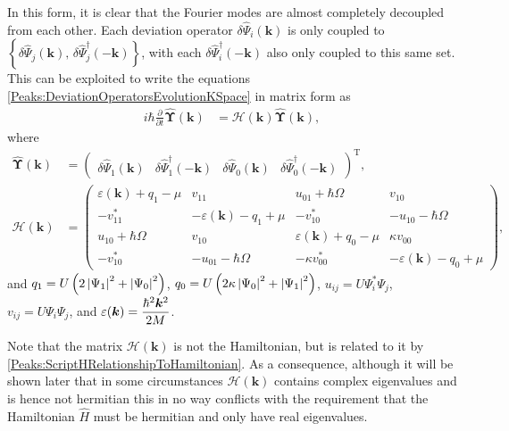 In this form, it is clear that the Fourier modes are almost completely decoupled from each other. Each deviation operator $\delta\hat{\Psi}_i(\bm{k})$ is only coupled to $\left\{\delta\hat{\Psi}_j(\bm{k}),\, \delta\hat{\Psi}_j^\dagger(-\bm{k})\right\}$, with each $\delta\hat{\Psi}_i^\dagger(-\bm{k})$ also only coupled to this same set. This can be exploited to write the equations \eqref{Peaks:DeviationOperatorsEvolutionKSpace} in matrix form as
\begin{align}
    \label{Peaks:DeviationOperatorsMatrixEvolution}
    i \hbar \frac{\partial }{\partial t}\hat{\bm{\Upsilon}}(\bm{k}) &= \mathcal{H}(\bm{k}) \hat{\bm{\Upsilon}}(\bm{k}),
\end{align}
where
\begin{align}
    \hat{\bm{\Upsilon}}(\bm{k}) &= 
    \begin{pmatrix}
        \delta\hat{\Psi}_1(\bm{k}) &
        \delta\hat{\Psi}_1^\dagger(-\bm{k}) &
        \delta\hat{\Psi}_0(\bm{k}) &
        \delta\hat{\Psi}_0^\dagger(-\bm{k})
    \end{pmatrix}^\text{T},\\
    \mathcal{H}(\bm{k}) &= 
    \begin{pmatrix}
        \varepsilon(\bm{k}) + q_{1} - \mu & v_{11} & u_{01} + \hbar \Omega & v_{10}\\
        -v_{11}^* & -\varepsilon(\bm{k}) - q_1 + \mu & -v_{10}^* & -u_{10} - \hbar \Omega\\
        u_{10} + \hbar \Omega & v_{10} & \varepsilon(\bm{k}) + q_0 - \mu & \kappa v_{00}\\
        -v_{10}^* & -u_{01} - \hbar \Omega & -\kappa v_{00}^* & -\varepsilon(\bm{k}) - q_0 + \mu
    \end{pmatrix},\label{Peaks:HMatrix}
\end{align}
and $q_1 = U\left(2\left|\Psi_1\right|^2+\left|\Psi_0\right|^2\right)$, $q_0 = U\left(2\kappa \left|\Psi_0\right|^2 + \left|\Psi_1\right|^2\right)$, $u_{ij} = U\Psi_i^*\Psi_j$, $v_{ij} = U\Psi_i\Psi_j$, and $\displaystyle \protect{\varepsilon(\bm{k}) = \frac{\hbar^2 \bm{k}^2}{2M}}$.

Note that the matrix $\mathcal{H}(\bm{k})$ is not the Hamiltonian, but is related to it by \eqref{Peaks:ScriptHRelationshipToHamiltonian}. As a consequence, although it will be shown later that in some circumstances $\mathcal{H}(\bm{k})$ contains complex eigenvalues and is hence not hermitian this in no way conflicts with the requirement that the Hamiltonian $\hat{H}$ must be hermitian and only have real eigenvalues.

